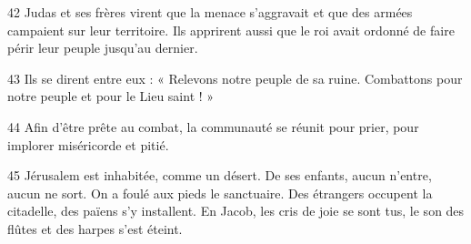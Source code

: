 42 Judas et ses frères virent que la menace s’aggravait et que des armées campaient sur leur territoire. Ils apprirent aussi que le roi avait ordonné de faire périr leur peuple jusqu’au dernier.

43 Ils se dirent entre eux : « Relevons notre peuple de sa ruine. Combattons pour notre peuple et pour le Lieu saint ! »

44 Afin d’être prête au combat, la communauté se réunit pour prier, pour implorer miséricorde et pitié.

45 Jérusalem est inhabitée, comme un désert. De ses enfants, aucun n’entre, aucun ne sort. On a foulé aux pieds le sanctuaire. Des étrangers occupent la citadelle, des païens s’y installent. En Jacob, les cris de joie se sont tus, le son des flûtes et des harpes s’est éteint.
